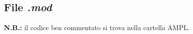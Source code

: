 \subsection{File \textit{.mod}}
\textbf{N.B.:} il codice ben commentato si trova nella cartella AMPL\@.

